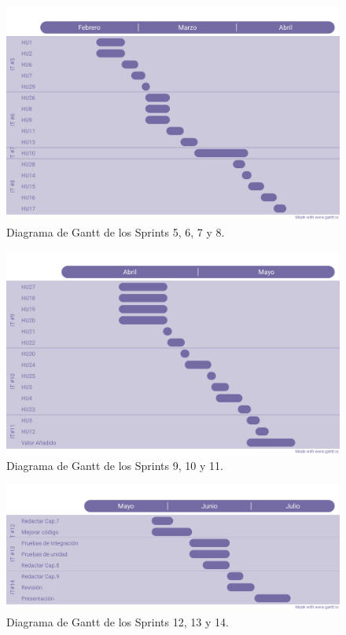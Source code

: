 \begin{figure}[H]

    \centering
    \centerline{\includegraphics[width=1\textwidth]{imagenes/c4/gantt2.png}}
    \caption{Diagrama de Gantt de los Sprints 5, 6, 7 y 8.}
    \label{fig:diagrama_gantt2}
\end{figure}

\begin{figure}[H]
    \centering
    \centerline{\includegraphics[width=1.1\textwidth]{imagenes/c4/gantt3.png}}
    \caption{Diagrama de Gantt de los Sprints 9, 10 y 11.}
    \label{fig:diagrama_gantt3}
\end{figure}

\begin{figure}[H]
    \centering
    \centerline{\includegraphics[width=1.2\textwidth]{imagenes/c4/gantt4.png}}
    \caption{Diagrama de Gantt de los Sprints 12, 13 y 14.}
    \label{fig:diagrama_gantt4}
\end{figure}
